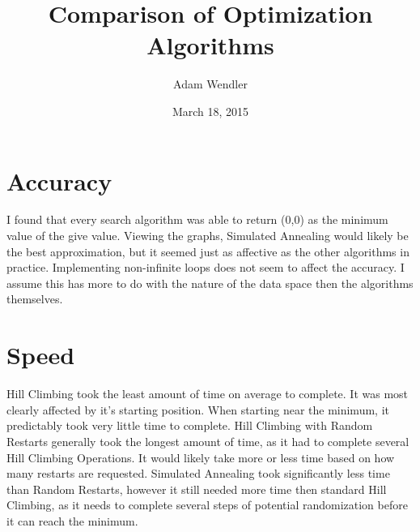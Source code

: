 \documentclass[11pt, oneside]{report}
\title{Comparison of  Optimization Algorithms}
\author{Adam Wendler}
\date{March 18, 2015}
\begin{document}
\maketitle

\section{Accuracy}
 I found that every search algorithm was able to return (0,0) as the minimum value of the give value. Viewing the graphs, Simulated Annealing would likely be the best approximation, but it seemed just as affective as the other algorithms in practice.  Implementing non-infinite loops does not seem to affect the accuracy.  I assume this has more to do with the nature of the data space then the algorithms themselves.  

\section{Speed}
 Hill Climbing took the least amount of time on average to complete.  It was most clearly affected by it's starting position.  When starting near the minimum, it predictably took very little time to complete.  Hill Climbing with Random Restarts generally took the longest amount of time, as it had to complete several Hill Climbing Operations.  It would likely take more or less time based on how many restarts are requested.  Simulated Annealing took significantly less time than Random Restarts, however it still needed more time then standard Hill Climbing, as it needs to complete several steps of potential randomization before it can reach the minimum.
 
 
\end{document}
